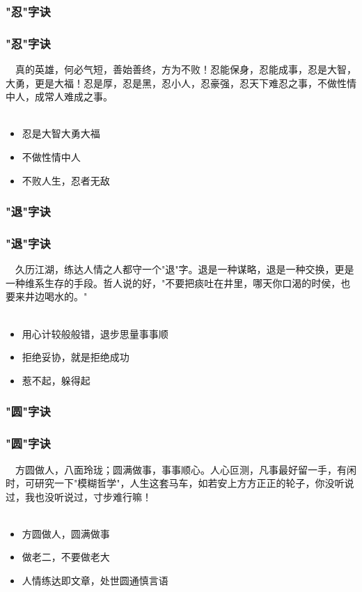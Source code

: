 \subsubsection{"忍"字诀}
\begin{frame}
\frametitle{"忍"字诀}
\noindent\handr~~真的英雄，何必气短，善始善终，方为不败！忍能保身，忍能成事，忍是大智，大勇，更是大福！忍是厚，忍是黑，忍小人，忍豪强，忍天下难忍之事，不做性情中人，成常人难成之事。
~\\
~\\
\begin{itemize}
    \item 忍是大智大勇大福
    \item 不做性情中人
    \item 不败人生，忍者无敌
\end{itemize}
\end{frame}

\subsubsection{"退"字诀}
\begin{frame}
\frametitle{"退"字诀}
\noindent\handr~~久历江湖，练达人情之人都守一个"退"字。退是一种谋略，退是一种交换，更是一种维系生存的手段。哲人说的好，"不要把痰吐在井里，哪天你口渴的时侯，也要来井边喝水的。"
~\\
~\\
\begin{itemize}
    \item 用心计较般般错，退步思量事事顺
    \item 拒绝妥协，就是拒绝成功
    \item 惹不起，躲得起
\end{itemize}
\end{frame}

\subsubsection{"圆"字诀}
\begin{frame}
\frametitle{"圆"字诀}
\noindent\handr~~方圆做人，八面玲珑；圆满做事，事事顺心。人心叵测，凡事最好留一手，有闲时，可研究一下"模糊哲学"，人生这套马车，如若安上方方正正的轮子，你没听说过，我也没听说过，寸步难行嘛！
~\\
~\\
\begin{itemize}
    \item 方圆做人，圆满做事
    \item 做老二，不要做老大
    \item 人情练达即文章，处世圆通慎言语
\end{itemize}
\end{frame}

